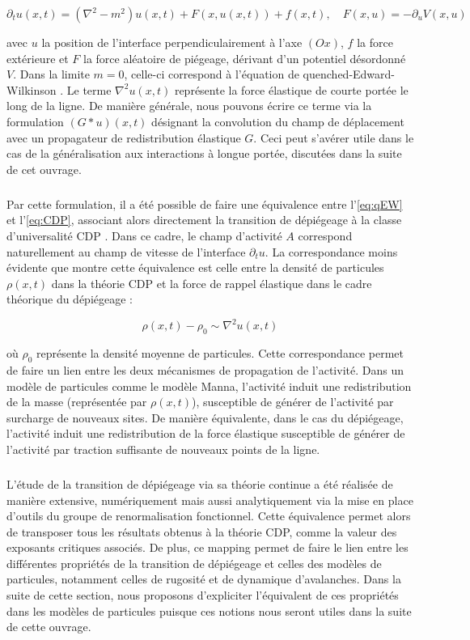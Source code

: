 \begin{equation}
	\partial_t u (x,t) = (\nabla^2 - m^2)u(x,t) + F(x, u(x,t)) + f(x,t), \quad F(x,u) = - \partial_u V(x,u)
	\label{eq:qEW}
\end{equation}

\noindent avec $u$ la position de l'interface perpendiculairement à l'axe $(Ox)$, $f$ la force extérieure et $F$ la force aléatoire de piégeage, dérivant d'un potentiel désordonné $V$. Dans la limite $m=0$, celle-ci correspond à l'équation de quenched-Edward-Wilkinson \cite{nattermann_dynamics_1992}. Le terme $\nabla^2 u (x,t)$ représente la force élastique de courte portée le long de la ligne. De manière générale, nous pouvons écrire ce terme via la formulation $(G\ast u) (x,t)$ désignant la convolution du champ de déplacement avec un propagateur de redistribution élastique $G$. Ceci peut s'avérer utile dans le cas de la généralisation aux interactions à longue portée, discutées dans la suite de cet ouvrage.

\subparagraph{}Par cette formulation, il a été possible de faire une équivalence entre l'\autoref{eq:qEW} et l'\autoref{eq:CDP}, associant alors directement la transition de dépiégeage à la classe d'universalité CDP \cite{le_doussal_exact_2015, wiese_hyperuniformity_2024}. Dans ce cadre, le champ d'activité $A$ correspond naturellement au champ de vitesse de l'interface $\partial_t u$. La correspondance moins évidente que montre cette équivalence est celle entre la densité de particules $\rho(x,t)$ dans la théorie CDP et la force de rappel élastique dans le cadre théorique du dépiégeage :

\begin{equation}
	\rho(x,t) - \rho_0 \sim \nabla^2 u (x,t)
	\label{eq:equivCDPdépiégeage}
\end{equation}

\noindent où $\rho_0$ représente la densité moyenne de particules. Cette correspondance permet de faire un lien entre les deux mécanismes de propagation de l'activité. Dans un modèle de particules comme le modèle Manna, l'activité induit une redistribution de la masse (représentée par $\rho(x,t)$), susceptible de générer de l'activité par surcharge de nouveaux sites. De manière équivalente, dans le cas du dépiégeage, l'activité induit une redistribution de la force élastique susceptible de générer de l'activité par traction suffisante de nouveaux points de la ligne.

\subparagraph{}L'étude de la transition de dépiégeage via sa théorie continue a été réalisée de manière extensive, numériquement mais aussi analytiquement via la mise en place d'outils du groupe de renormalisation fonctionnel. Cette équivalence permet alors de transposer tous les résultats obtenus à la théorie CDP, comme la valeur des exposants critiques associés. De plus, ce mapping permet de faire le lien entre les différentes propriétés de la transition de dépiégeage et celles des modèles de particules, notamment celles de rugosité et de dynamique d'avalanches. Dans la suite de cette section, nous proposons d'expliciter l'équivalent de ces propriétés dans les modèles de particules puisque ces notions nous seront utiles dans la suite de cette ouvrage.

